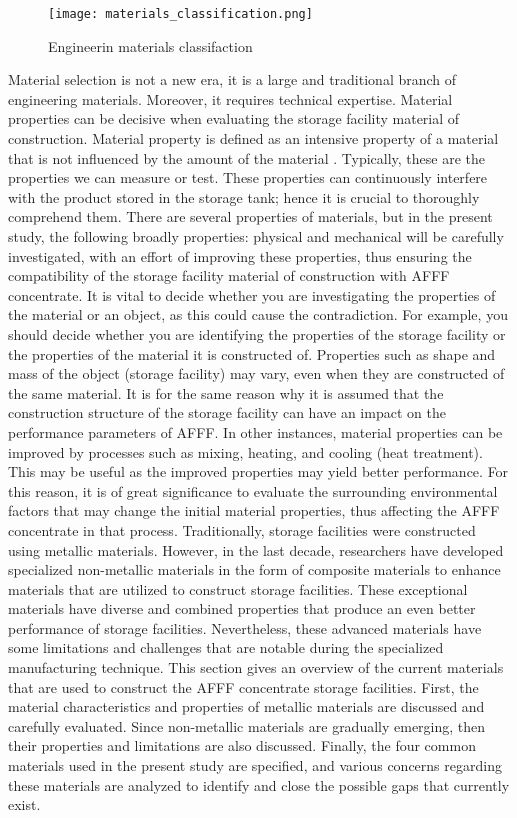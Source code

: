 \begin{figure}[H]
    \centering
    \texttt{[image: materials\_classification.png]}
    \caption{Engineerin materials classifaction \cite{timings2008fabrication}}
    \label{ch3:figure:materials}
\end{figure}

Material selection is not a new era, it is a large and traditional branch of engineering materials. Moreover, it requires technical expertise. Material properties can be decisive when evaluating the storage facility material of construction. Material property is defined as an intensive property of a material that is not influenced by the amount of the material \cite{mcarthur2004engineering}. Typically, these are the properties we can measure or test. These properties can continuously interfere with the product stored in the storage tank; hence it is crucial to thoroughly comprehend them. There are several properties of materials, but in the present study, the following broadly properties: physical and mechanical will be carefully investigated, with an effort of improving these properties, thus ensuring the compatibility of the storage facility material of construction with AFFF concentrate.
It is vital to decide whether you are investigating the properties of the material or an object, as this could cause the contradiction. For example, you should decide whether you are identifying the properties of the storage facility or the properties of the material it is constructed of. Properties such as shape and mass of the object (storage facility) may vary, even when they are constructed of the same material. It is for the same reason why it is assumed that the construction structure of the storage facility can have an impact on the performance parameters of AFFF.  In other instances, material properties can be improved by processes such as mixing, heating, and cooling (heat treatment). This may be useful as the improved properties may yield better performance. For this reason, it is of great significance to evaluate the surrounding environmental factors that may change the initial material properties, thus affecting the AFFF concentrate in that process.
Traditionally, storage facilities were constructed using metallic materials. However, in the last decade, researchers have developed specialized non-metallic materials in the form of composite materials to enhance materials that are utilized to construct storage facilities. These exceptional materials have diverse and combined properties that produce an even better performance of storage facilities. Nevertheless, these advanced materials have some limitations and challenges that are notable during the specialized manufacturing technique. 
This section gives an overview of the current materials that are used to construct the AFFF concentrate storage facilities. First, the material characteristics and properties of metallic materials are discussed and carefully evaluated. Since non-metallic materials are gradually emerging, then their properties and limitations are also discussed. Finally, the four common materials used in the present study are specified, and various concerns regarding these materials are analyzed to identify and close the possible gaps that currently exist.   

